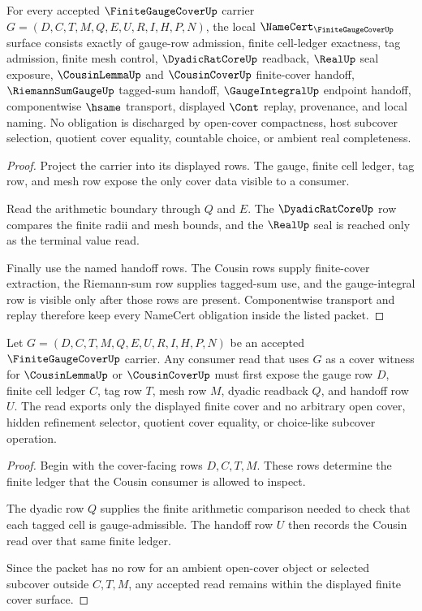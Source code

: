 \begin{theorem}
\label{thm:finite-gauge-cover-namecert-obligations}
For every accepted $\FiniteGaugeCoverUp$ carrier $G=(D,C,T,M,Q,E,U,R,I,H,P,N)$, the local $\NameCert_{\FiniteGaugeCoverUp}$ surface consists exactly of gauge-row admission, finite cell-ledger exactness, tag admission, finite mesh control, $\DyadicRatCoreUp$ readback, $\RealUp$ seal exposure, $\CousinLemmaUp$ and $\CousinCoverUp$ finite-cover handoff, $\RiemannSumGaugeUp$ tagged-sum handoff, $\GaugeIntegralUp$ endpoint handoff, componentwise $\hsame$ transport, displayed $\Cont$ replay, provenance, and local naming. No obligation is discharged by open-cover compactness, host subcover selection, quotient cover equality, countable choice, or ambient real completeness.
\end{theorem}
\begin{proof}
Project the carrier into its displayed rows. The gauge, finite cell ledger, tag row, and mesh row expose the only cover data visible to a consumer.

Read the arithmetic boundary through $Q$ and $E$. The $\DyadicRatCoreUp$ row compares the finite radii and mesh bounds, and the $\RealUp$ seal is reached only as the terminal value read.

Finally use the named handoff rows. The Cousin rows supply finite-cover extraction, the Riemann-sum row supplies tagged-sum use, and the gauge-integral row is visible only after those rows are present. Componentwise transport and replay therefore keep every NameCert obligation inside the listed packet.
\end{proof}

\begin{theorem}
\label{thm:finite-gauge-cover-cousin-handoff}
Let $G=(D,C,T,M,Q,E,U,R,I,H,P,N)$ be an accepted $\FiniteGaugeCoverUp$ carrier. Any consumer read that uses $G$ as a cover witness for $\CousinLemmaUp$ or $\CousinCoverUp$ must first expose the gauge row $D$, finite cell ledger $C$, tag row $T$, mesh row $M$, dyadic readback $Q$, and handoff row $U$. The read exports only the displayed finite cover and no arbitrary open cover, hidden refinement selector, quotient cover equality, or choice-like subcover operation.
\end{theorem}
\begin{proof}
Begin with the cover-facing rows $D,C,T,M$. These rows determine the finite ledger that the Cousin consumer is allowed to inspect.

The dyadic row $Q$ supplies the finite arithmetic comparison needed to check that each tagged cell is gauge-admissible. The handoff row $U$ then records the Cousin read over that same finite ledger.

Since the packet has no row for an ambient open-cover object or selected subcover outside $C,T,M$, any accepted read remains within the displayed finite cover surface.
\end{proof}


